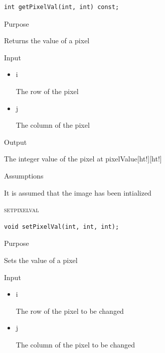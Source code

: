 \documentclass[pdftex, 11pt]{article}
\begin{document}
\begin{description}
\begin{description}
\begin{lstlisting}
int getPixelVal(int, int) const;
\end{lstlisting}

			\item{Purpose}

				Returns the value of a pixel

			\item{Input}

				\begin{itemize}

					\item{i}
					
						The row of the pixel

					\item{j} 

						The column of the pixel

				\end{itemize}

			\item{Output}

				The integer value of the pixel at 
				pixelValue[ht!][ht!]


			\item{Assumptions}

				It is assumed that the image has been intialized


		\end{description}


	\item{\textsc{setpixelval}}
		\begin{description}

\begin{lstlisting}
void setPixelVal(int, int, int);
\end{lstlisting}

			\item{Purpose}

				Sets the value of a pixel

			\item{Input}

				\begin{itemize}

					\item{i}

						The row of the pixel to be changed

					\item{j}

						The column of the pixel to be changed

				\end{itemize}


\end{description}
\end{description}
\end{document}
